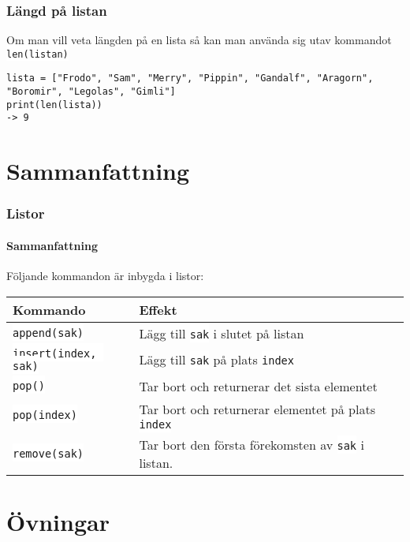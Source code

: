 \documentclass{beamer}
\newcommand{\code}[1]{\colorbox{white}{\lstinline{#1}}}
\begin{document}
\begin{frame}[fragile]
\frametitle{Längd på listan}

Om man vill veta längden på en lista så kan man använda sig utav kommandot \code{len(listan)}

\begin{lstlisting}
lista = ["Frodo", "Sam", "Merry", "Pippin", "Gandalf", "Aragorn", "Boromir", "Legolas", "Gimli"]
print(len(lista))
-> 9
\end{lstlisting}

\end{frame}

\section{Sammanfattning}

\begin{frame}[fragile]
\frametitle{Listor}
\framesubtitle{Sammanfattning}

Följande kommandon är inbygda i listor:

\begin{center}
\begin{tabular}{|lp{6cm}|}
\hline
	\textbf{Kommando} & \textbf{Effekt} \\ \hline
	\code{append(sak)}	& Lägg till \code{sak} i slutet på listan \\ 
	\code{insert(index, sak)} & Lägg till \code{sak} på plats \code{index} \\ 
	\code{pop()}			& Tar bort och returnerar det sista elementet\\ 
	\code{pop(index)}		& Tar bort och returnerar elementet på plats \code{index} \\
	\code{remove(sak)}	& Tar bort den första förekomsten av \code{sak} i listan. \\ \hline
\end{tabular}
\end{center}

\end{frame}

\section{Övningar}
\end{document}
